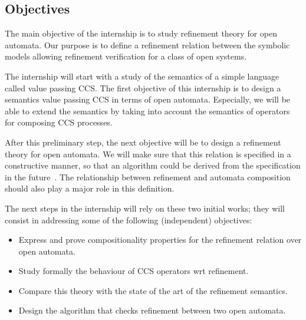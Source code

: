 \documentclass[11pt,fleqn]{article}
\begin{document}
\subsection*{Objectives}


The main objective of the internship is to study refinement theory for open automata.  
Our purpose is to define a refinement relation between the symbolic models allowing refinement verification for a class of open systems.

The internship will start with a study of the semantics of a simple language called value passing CCS. The first objective of this internship is to design a semantics value passing CCS in terms of open automata. Especially, we will be able to extend the semantics by taking into account the semantics of operators for composing CCS processes.

After this preliminary step, the next objective will be to design a refinement theory for open automata. We will make sure that this relation is specified in a constructive manner, so that an algorithm could be derived from the specification in the future~\cite{Bellegarde:MEMOCODE2003}.
The relationship between refinement and automata composition should also play a major role in this definition.



The next steps in the internship will rely on these two initial works; they will consist in addressing some of the following (independent) objectives:
\begin{itemize}
\item Express and prove compositionality properties for the refinement relation over open automata.
\item Study formally the behaviour of CCS operators wrt refinement.
\item Compare this theory with the state of the art of the refinement semantics.
\item Design the algorithm that checks refinement between two open automata.
\end{itemize}
\end{document}
